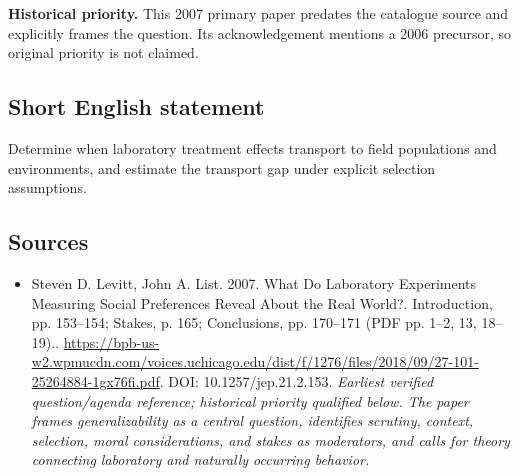 \documentclass[11pt]{article}
\begin{document}
\par\textbf{Historical priority.} This 2007 primary paper predates the catalogue source and explicitly frames the question. Its acknowledgement mentions a 2006 precursor, so original priority is not claimed.

\subsection{Short English statement}
Determine when laboratory treatment effects transport to field populations and environments, and estimate the transport gap under explicit selection assumptions.

\subsection{Sources}
\begin{itemize}\raggedright
\item[\textnormal{[S1]}]\hypertarget{source:30007588:1}{} Steven D. Levitt, John A. List. 2007. What Do Laboratory Experiments Measuring Social Preferences Reveal About the Real World?. Introduction, pp. 153–154; Stakes, p. 165; Conclusions, pp. 170–171 (PDF pp. 1–2, 13, 18–19)..
\url{https://bpb-us-w2.wpmucdn.com/voices.uchicago.edu/dist/f/1276/files/2018/09/27-101-25264884-1gx76fi.pdf}.
DOI: 10.1257/jep.21.2.153.
{\small\textit{Earliest verified question/agenda reference; historical priority qualified below. The paper frames generalizability as a central question, identifies scrutiny, context, selection, moral considerations, and stakes as moderators, and calls for theory connecting laboratory and naturally occurring behavior.}}
\end{itemize}
\end{document}
